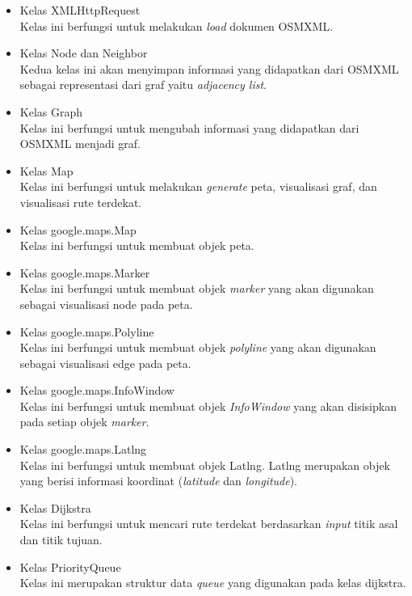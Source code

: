 \begin{itemize}
  \item Kelas XMLHttpRequest\\
  Kelas ini berfungsi untuk melakukan \textit{load} dokumen OSMXML.
  
  \item Kelas Node dan Neighbor\\
  Kedua kelas ini akan menyimpan informasi yang didapatkan dari OSMXML sebagai
  representasi dari graf yaitu \textit{adjacency list}.
  
  \item Kelas Graph\\
  Kelas ini berfungsi untuk mengubah informasi yang didapatkan dari OSMXML
  menjadi graf.
  
  \item Kelas Map\\
  Kelas ini berfungsi untuk melakukan \textit{generate} peta, visualisasi graf,
  dan visualisasi rute terdekat.
  
  \item Kelas google.maps.Map\\
  Kelas ini berfungsi untuk membuat objek peta.
  
  \item Kelas google.maps.Marker\\
  Kelas ini berfungsi untuk membuat objek \textit{marker} yang akan digunakan
  sebagai visualisasi node pada peta.
  
  \item Kelas google.maps.Polyline\\
  Kelas ini berfungsi untuk membuat objek \textit{polyline} yang akan digunakan
  sebagai visualisasi edge pada peta.
  
  \item Kelas google.maps.InfoWindow\\
  Kelas ini berfungsi untuk membuat objek \textit{InfoWindow} yang akan
  disisipkan pada setiap objek \textit{marker}.
  
  \item Kelas google.maps.Latlng\\
  Kelas ini berfungsi untuk membuat objek Latlng. Latlng merupakan objek yang
  berisi informasi koordinat (\textit{latitude} dan \textit{longitude}).
  
  \item Kelas Dijkstra\\
  Kelas ini berfungsi untuk mencari rute terdekat berdasarkan \textit{input}
  titik asal dan titik tujuan.
  
  \item Kelas PriorityQueue\\
  Kelas ini merupakan struktur data \textit{queue} yang digunakan pada
  kelas dijkstra.
\end{itemize}



















